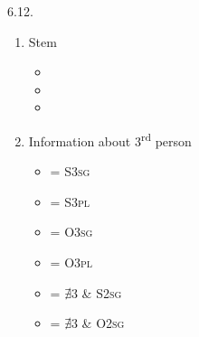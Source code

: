 \begin{refsection}
\begin{practiceproblemsolution}{6.12. \langnameCree}
\begin{enumerate}
 \begin{multicols}{2}
        \begin{itemize}

            \item {} = volitive ()
            \item {} = past
            \item $\varnothing$ = present
            \item {} = future
        \end{itemize}
    \end{multicols}
    \item Stem

 \begin{multicols}{2}
        \begin{itemize}

            \item {}
            \item {}
            \item {}
        \end{itemize}
    \end{multicols}
    \item Information about 3\textsuperscript{rd} person

\begin{multicols}{2}
        \begin{itemize}

            \item {} = S3\textsc{sg}
            \item {} = S3\textsc{pl}
            \item {} = O3\textsc{sg}
            \item {} = O3\textsc{pl}
            \item {} = $\nexists$3 \& S2\textsc{sg}
            \item {} = $\nexists$3 \& O2\textsc{sg}
        \end{itemize}
    \end{multicols}
\end{enumerate}


\end{practiceproblemsolution}
\end{refsection}
